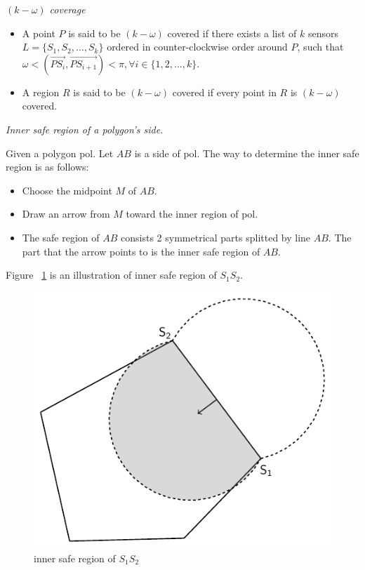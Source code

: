 
\begin{df} 
{\itshape$(k-\omega)$ coverage}
\begin{itemize}
	\item A point $P$ is said to be $(k-\omega)$ covered if there exists a list of $k$ sensors $L = \{S_1, S_2,...,S_k\}$ ordered in counter-clockwise order around $P$, such that $\omega < (\overrightarrow{PS_i}, \overrightarrow{PS_{i+1}}) < \pi, \forall i \in \{1,2,...,k\}$.
	\item A region $R$ is said to be $(k-\omega)$ covered if every point in $R$ is $(k-\omega)$ covered.
\end{itemize}
\end{df}
\begin{df}
{\itshape Inner safe region of a polygon's side.}\par
Given a polygon {\sc pol}. Let $AB$ is a side of {\sc pol}. The way to determine the inner safe region is as follows:
\begin{itemize}
	\item Choose the midpoint $M$ of $AB$.
	\item Draw an arrow from $M$ toward the inner region of {\sc pol}.
	\item The safe region of $AB$ consists 2 symmetrical parts splitted by line $AB$. The part that the arrow points to is the inner safe region of $AB$.
\end{itemize}
\end{df}
Figure ~\ref{innersafe} is an illustration of inner safe region of $S_1S_2$.
\begin{figure}[!h]
	\begin{center}
	\includegraphics[scale=1.]{innersafe.pdf}	
	\caption{inner safe region of $S_1S_2$}
	\label{innersafe}
	\end{center}
\end{figure}
